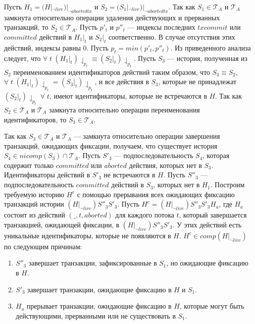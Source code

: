 \begin{myproof}
Пусть $H_1 = (H|_{\neg live})|_{\neg abortedtx}$ и $S_2 = (S_1|_{\neg live})|_{\neg abortedtx}$. Так как $S_1 \in \mathcal{T}_A$ и $\mathcal{T}_A$ замкнута относительно операции удаления действующих и прерванных транзакций, то $S_2 \in \mathcal{T}_A$. Пусть $p'_t$ и $p''_t$ --- индексы последних $txcommit$ или $committed$ действий в $H_1|_t$ и $S_2|_t$ соответственно. В случае отсутствия этих действий, индексы равны 0. Пусть $p_t=min(p'_t,p''_t)$. Из приведенного анализа следует, что $\forall \; t \; (H_1|_t)\downharpoonleft_{p_t} \equiv (S_2|_t)\downharpoonleft_{p_t}$. Пусть $S_3$ --- история, полученная из $S_2$ переименованием идентификаторов действий таким образом, что $S_3 \equiv S_2$, $\forall \; t \; (H_1|_t)\downharpoonleft_{p_t} = (S_3|_t)\downharpoonleft_{p_t}$, и все действия в $S_3$, которые не принадлежат $(S_2|_t)\downharpoonleft_{p_t} \; \forall \; t$, имеют идентификаторы, которые не встречаются в $H$. Так как $S_2 \in \mathcal{T}_A$ и $\mathcal{T}_A$ замкнута относительно операции переименования идентификаторов, то $S_3 \in \mathcal{T}_A$.

Так как $S_3 \in \mathcal{T}_A$ и $\mathcal{T}_A$ --- замкнута относительно операции завершения транзакций, ожидающих фиксации, получаем, что существует история $S_4 \in nicomp(S_3) \cap \mathcal{T}_A$. Пусть $S'_3$ --- подпоследовательность $S_4$, которая содержит только $committed$ или $aborted$ действия, которых нет в $S_3$. %
Идентификаторы действий в $S'_3$ не встречаются в $H$. Пусть $S''_3$ --- подпоследовательность $committed$ действий в $S_3$, которых нет в $H_1$. Построим требуемую историю $H^c$ с помощью прерывания всех ожидающих фиксацию транзакций истории $(H|_{\neg live})S''_3S'_3$. Пусть $H^c = (H|_{\neg live})S''_3S'_3H_a$, где $H_a$ состоит из действий $(\_, t, aborted)$ для каждого потока $t$, который завершается транзакцией, ожидающей фиксации, в $(H|_{\neg live})S''_3S'_3$. У этих действий есть уникальные идентификаторы, которые не появляются в $H$. $H^c \in comp(H|_{\neg live})$ по следующим причинам: 
\begin{enumerate}[label=(\roman*)]
\item $S''_3$ завершает транзакции, зафиксированные в $S_1$, но ожидающие фиксацию в $H$.  
\item $S'_3$ завершает транзакции, ожидающие фиксацию в $H$ и $S_1$.
\item $H_a$ прерывает транзакции, ожидающие фиксацию в $H$, которые могут быть действующими, прерванными или не существовать в $S_1$.
\end{enumerate}


\end{myproof}
